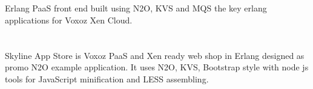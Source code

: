 \documentclass[11pt]{article}
\begin{document}

\section*{}
\paragraph{}
    Erlang PaaS front end built using N2O, KVS and MQS the key erlang
    applications for Voxoz Xen Cloud.




\section*{}
\paragraph{}
    Skyline App Store is Voxoz PaaS and Xen ready web shop in Erlang designed as
    promo N2O example application. It uses N2O, KVS, Bootstrap style with
    node js tools for JavaScript minification and LESS assembling.





\end{document}
